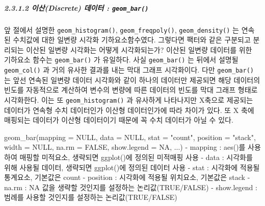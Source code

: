 \documentclass[
]{article}
\newenvironment{Shaded}{\begin{snugshade}}{\end{snugshade}}
\newcommand{\AttributeTok}[1]{\textcolor[rgb]{0.77,0.63,0.00}{#1}}
\newcommand{\ConstantTok}[1]{\textcolor[rgb]{0.00,0.00,0.00}{#1}}
\newcommand{\FunctionTok}[1]{\textcolor[rgb]{0.00,0.00,0.00}{#1}}
\newcommand{\NormalTok}[1]{#1}
\newcommand{\SpecialCharTok}[1]{\textcolor[rgb]{0.00,0.00,0.00}{#1}}
\newcommand{\StringTok}[1]{\textcolor[rgb]{0.31,0.60,0.02}{#1}}
\begin{document}
\hypertarget{uxc774uxc0b0discrete-uxb370uxc774uxd130-geom_bar}{%
\subparagraph{\texorpdfstring{2.3.1.2 이산(Discrete) 데이터 : \texttt{geom\_bar()}}{2.3.1.2 이산(Discrete) 데이터 : geom\_bar()}}\label{uxc774uxc0b0discrete-uxb370uxc774uxd130-geom_bar}}

앞 절에서 설명한 \texttt{geom\_histogram()}, \texttt{geom\_freqpoly()}, \texttt{geom\_density()} 는 연속된 수치값에 대한 일변량 시각화 기하요소함수였다. 그렇다면 팩터와 같은 구분되고 분리되는 이산된 일변량 시각화는 어떻게 시각화되는가? 이산된 일변량 데이터를 위한 기하요소 함수는 \texttt{geom\_bar()} 가 유일하다. 사실 \texttt{geom\_bar()} 는 뒤에서 설명될 \texttt{geom\_col()} 과 거의 유사한 결과를 내는 막대 그래프 시각화이다. 다만 \texttt{geom\_bar()} 는 앞선 연속된 일변량 데이터 시각화와 같이 하나의 데이터만 제공되면 해당 데이터의 빈도를 자동적으로 계산하여 변수의 변량에 따른 데이터의 빈도를 막대 그래프 형태로 시각화한다. 이는 또 \texttt{geom\_histogram()} 과 유사하게 나타나지만 X축으로 제공되는 데이터가 연속형 수치 데이터인가 이산형 데이터인가에 따라 차이가 있다. 또 X 축에 매핑되는 데이터가 이산형 데이터이기 때문에 꼭 수치 데이터가 아닐 수 있다.

\begin{Shaded}
\begin{Highlighting}[]
\FunctionTok{geom\_bar}\NormalTok{(}\AttributeTok{mapping =} \ConstantTok{NULL}\NormalTok{, }\AttributeTok{data =} \ConstantTok{NULL}\NormalTok{, }\AttributeTok{stat =} \StringTok{"count"}\NormalTok{, }\AttributeTok{position =} \StringTok{"stack"}\NormalTok{, }\AttributeTok{width =} \ConstantTok{NULL}\NormalTok{, }\AttributeTok{na.rm =} \ConstantTok{FALSE}\NormalTok{, }\AttributeTok{show.legend =} \ConstantTok{NA}\NormalTok{, ...)}
  \SpecialCharTok{{-}}\NormalTok{ mapping }\SpecialCharTok{:} \FunctionTok{aes}\NormalTok{()를 사용하여 매핑할 미적요소, 생략되면 }\FunctionTok{ggplot}\NormalTok{()에 정의된 미적매핑 사용}
  \SpecialCharTok{{-}}\NormalTok{ data }\SpecialCharTok{:}\NormalTok{ 시각화를 위해 사용될 데이터, 생략되면 }\FunctionTok{ggplot}\NormalTok{()에 정의된 데이터 사용}
  \SpecialCharTok{{-}}\NormalTok{ stat }\SpecialCharTok{:}\NormalTok{ 시각화에 적용될 통계요소, 기본값은 }\StringTok{\textquotesingle{}count\textquotesingle{}}
  \SpecialCharTok{{-}}\NormalTok{ position }\SpecialCharTok{:}\NormalTok{ 시각화에 적용될 위치요소, 기본값은 }\StringTok{\textquotesingle{}stack\textquotesingle{}}
  \SpecialCharTok{{-}}\NormalTok{ na.rm }\SpecialCharTok{:} \ConstantTok{NA}\NormalTok{ 값을 생략할 것인지를 설정하는 논리값(}\ConstantTok{TRUE}\SpecialCharTok{/}\ConstantTok{FALSE}\NormalTok{)}
  \SpecialCharTok{{-}}\NormalTok{ show.legend }\SpecialCharTok{:}\NormalTok{ 범례를 사용할 것인지를 설정하는 논리값(}\ConstantTok{TRUE}\SpecialCharTok{/}\ConstantTok{FALSE}\NormalTok{) }
\end{Highlighting}
\end{Shaded}
\end{document}
